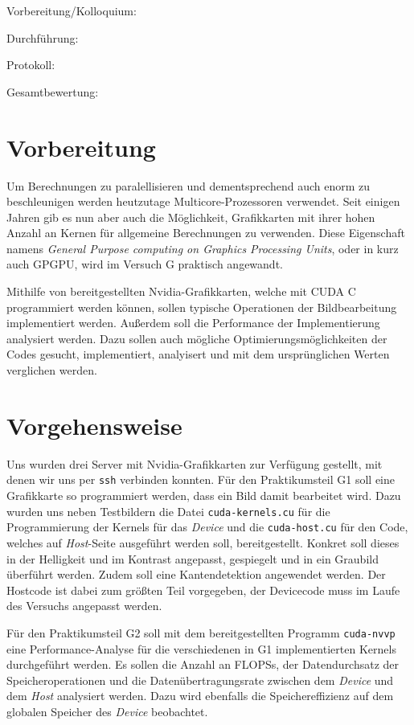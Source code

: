 \documentclass[12pt,a4paper]{scrartcl}
\begin{document}
Vorbereitung/Kolloquium:

Durchf\"uhrung:

Protokoll:

Gesamtbewertung:
\clearpage



\section{Vorbereitung}

Um Berechnungen zu paralellisieren und dementsprechend auch enorm zu beschleunigen werden heutzutage Multicore-Prozessoren verwendet.
Seit einigen Jahren gib es nun aber auch die M\"oglichkeit, Grafikkarten mit ihrer hohen Anzahl an Kernen f\"ur allgemeine Berechnungen zu verwenden.
Diese Eigenschaft namens \textit{General Purpose computing on Graphics Processing Units}, oder in kurz auch GPGPU, wird im Versuch G praktisch angewandt.

Mithilfe von bereitgestellten Nvidia-Grafikkarten, welche mit CUDA C programmiert werden k\"onnen, sollen typische Operationen der Bildbearbeitung implementiert werden.
Au\ss erdem soll die Performance der Implementierung analysiert werden.
Dazu sollen auch m\"ogliche Optimierungsm\"oglichkeiten der Codes gesucht, implementiert, analyisert und mit dem urspr\"unglichen Werten verglichen werden.


\section{Vorgehensweise}
Uns wurden drei Server mit Nvidia-Grafikkarten zur Verf\"ugung gestellt, mit denen wir uns per \texttt{ssh} verbinden konnten.
F\"ur den Praktikumsteil G1 soll eine Grafikkarte so programmiert werden, dass ein Bild damit bearbeitet wird.
Dazu wurden uns neben Testbildern die Datei \texttt{cuda-kernels.cu} f\"ur die Programmierung der Kernels f\"ur das \textit{Device} und die \texttt{cuda-host.cu} f\"ur den Code, welches auf \textit{Host}-Seite ausgef\"uhrt werden soll, bereitgestellt.
Konkret soll dieses in der Helligkeit und im Kontrast angepasst, gespiegelt und in ein Graubild \"uberf\"uhrt werden.
Zudem soll eine Kantendetektion angewendet werden.
Der Hostcode ist dabei zum gr\"o\ss ten Teil vorgegeben, der Devicecode muss im Laufe des Versuchs angepasst werden.

F\"ur den Praktikumsteil G2 soll mit dem bereitgestellten Programm \texttt{cuda-nvvp} eine Performance-Analyse f\"ur die verschiedenen in G1 implementierten Kernels durchgef\"uhrt werden.
Es sollen die Anzahl an FLOPSs, der Datendurchsatz der Speicheroperationen und die Daten\"ubertragungsrate zwischen dem \textit{Device} und dem \textit{Host} analysiert werden.
Dazu wird ebenfalls die Speichereffizienz auf dem globalen Speicher des \textit{Device} beobachtet.
\end{document}
